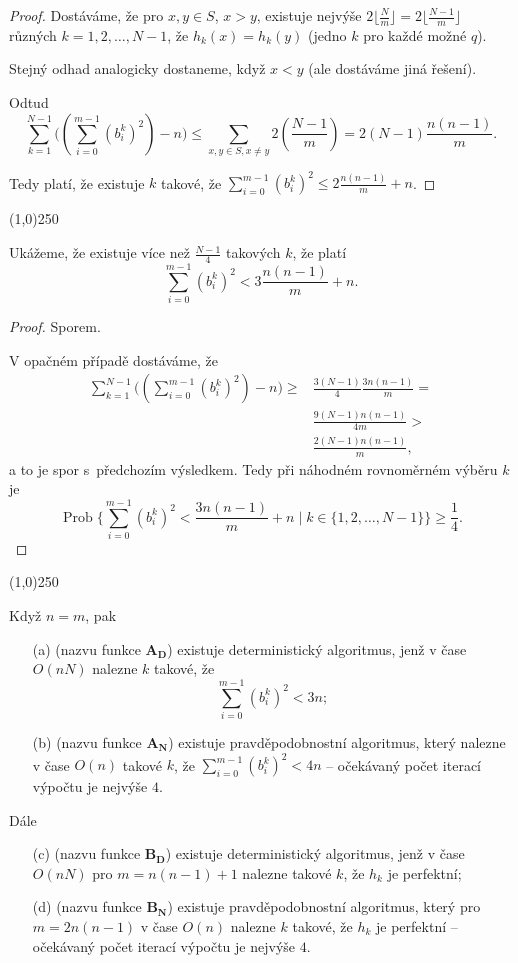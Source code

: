 \documentclass[a4paper,12pt]{article}
\newenvironment{myproof}{
  \begin{proof}
    
  }{
  \end{proof}
  \begin{center}
   \line(1,0){250}
   \end{center}
  }
\DeclareMathOperator*{\Prob}{Prob}
\begin{document}
\begin{myproof}
Dostáváme, že pro $x,y\in S$, $x>y$, existuje nejvýše 
$2\lfloor\frac Nm\rfloor =2\lfloor\frac {N-1}m\rfloor$ různých $
k=1,2,\dots,N-1$, že $h_k(x)=h_k(y)$ (jedno $k$ pro každé možné $q$). 

Stejný odhad analogicky dostaneme, když $
x<y$ 
(ale dostáváme jiná řešení). 

Odtud 
$$\sum_{k=1}^{N-1}\big((\sum_{i=0}^{m-1}(b_i^k)^2)-n\big)\le\sum_{
x,y\in S,x\ne y}2(\frac {N-1}m)=2(N-1)\frac {n(n-1)}m.$$

Tedy platí, že existuje $k$ takové, že $\sum_{i=0}^{m-1}(b_i^
k)^2\le 2\frac {n(n-1)}m+n$. 
\end{myproof}

\begin{lemma}
    Ukážeme, že existuje více než $\frac {N-
1}4$ takových 
$k$, že platí
$$\sum_{i=0}^{m-1}(b_i^k)^2<3\frac {n(n-1)}m+n.$$
\end{lemma}
\begin{myproof}
    Sporem.
    
V opačném případě dostáváme, že 
\begin{align*}\sum_{k=1}^{N-1}\big((\sum_{i=0}^{m-1}(b_i^k)^2)-n\big)\ge&\frac {
3(N-1)}4\frac {3n(n-1)}m=\\
&\frac {9(N-1)n(n-1)}{4m}>\\
&\frac {2(N-1)n(n-1)}m,\end{align*}
a to je spor s~předchozím výsledkem. Tedy při náhodném rovnoměrném 
výběru $k$ je 
$$\Prob\{\sum_{i=0}^{m-1}(b_i^k)^2<\frac {3n(n-1)}m+n\mid k\in \{
1,2,\dots,N-1\}\}\ge\frac 14.$$
\end{myproof}

\begin{veta}Když $n=m$, pak 
\begin{enumerate}
\item[(a)] (nazvu funkce $\mathbf{A_D}$)
existuje deterministický algoritmus, jenž v čase $O(nN)$ 
nalezne $k$ takové, že 
$$\sum_{i=0}^{m-1}(b_i^k)^2<3n;$$
\item[(b)] (nazvu funkce $\mathbf{A_N}$)
existuje pravděpodobnostní algoritmus, který 
nalezne v čase $O(n)$ takové $k$, že $\sum_{i=0}^{m-1}(b_
i^k)^2<4n$ -- očekávaný počet iterací výpočtu je nejvýše $
4$.
\end{enumerate}
Dále 
\begin{enumerate}
\item[(c)] (nazvu funkce $\mathbf{B_D}$)
existuje deterministický algoritmus, jenž v čase $O(nN)$ pro 
$m=n(n-1)+1$ nalezne takové $k$, že $h_k$ je 
perfektní;
\item[(d)] (nazvu funkce $\mathbf{B_N}$)
existuje pravděpodobnostní algoritmus, který pro 
$m=2n(n-1)$ v čase $O(n)$ nalezne $k$ takové, že $h_k$ je 
perfektní -- očekávaný počet iterací výpočtu 
je nejvýše $4$.
\end{enumerate}
\end{veta}
\end{document}
